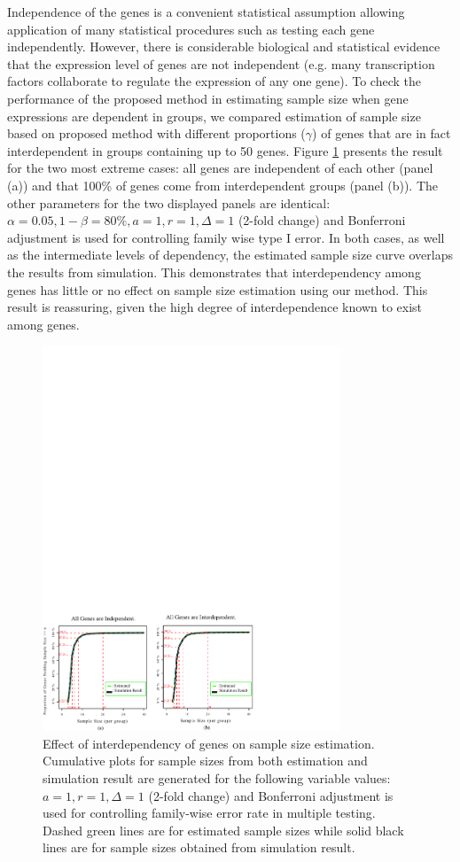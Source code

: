 \documentclass{bioinfo}
\begin{document}
Independence of the genes is a convenient statistical assumption
allowing application of many statistical procedures such as
testing each gene independently. However, there is considerable
biological and statistical evidence that the expression level of
genes are not independent (e.g. many transcription factors
collaborate to regulate the expression of any one gene). To check
the performance of the proposed method in estimating sample size
when gene expressions are dependent in groups, we compared
estimation of sample size based on proposed method with different
proportions ($\gamma$) of genes that are in fact interdependent in
groups containing up to 50 genes. Figure \ref{fig:ResDep} presents
the result for the two most extreme cases: all genes are
independent of each other (panel (a)) and that 100\% of genes come
from interdependent groups (panel (b)). The other parameters for
the two displayed panels are identical: $\alpha = 0.05, 1 - \beta
= 80\%, a = 1, r = 1, \Delta = 1$ (2-fold change) and Bonferroni
adjustment is used for controlling family wise type I error. In
both cases, as well as the intermediate levels of dependency, the
estimated sample size curve overlaps the results from simulation.
This demonstrates that interdependency among genes has little or
no effect on sample size estimation using our method. This result
is reassuring, given the high degree of interdependence known to
exist among genes.

\begin{figure}[h]
  \centerline{\includegraphics*[width=3.5in]{ResDepF.pdf}}
  \caption[Effect of interdependency of genes on sample size estimation]
  {Effect of interdependency of genes on sample size estimation.
    Cumulative plots for sample sizes from both estimation and simulation result
    are generated for the following variable values: $a = 1, r = 1, \Delta = 1$ (2-fold
    change) and Bonferroni adjustment is used for controlling family-wise error rate in multiple testing. Dashed green lines are for estimated sample sizes
    while solid black lines are for sample sizes obtained from simulation result.}
  \label{fig:ResDep}
\end{figure}
\end{document}
